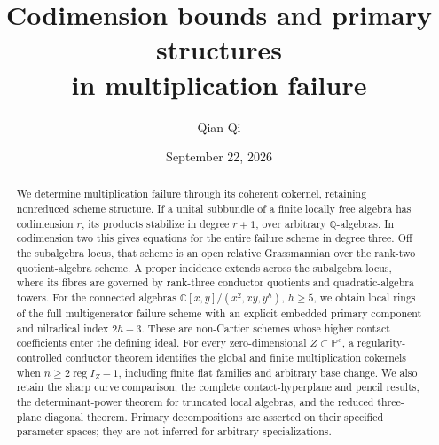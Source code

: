 \documentclass[11pt,reqno]{amsart}
\title[Codimension and multiplication failure]{Codimension bounds and primary structures\\in multiplication failure}
\author{Qian Qi}
\date{September 22, 2026}
\numberwithin{equation}{section}
\theoremstyle{definition}\newtheorem{definition}[theorem]{Definition}
\theoremstyle{remark}\newtheorem{remark}[theorem]{Remark}
\newcommand{\C}{\mathbb C}
\begin{document}
\begin{abstract}
We determine multiplication failure through its coherent cokernel, retaining nonreduced scheme structure. If a unital subbundle of a finite locally free algebra has codimension $r$, its products stabilize in degree $r+1$, over arbitrary $\mathbb Q$-algebras. In codimension two this gives equations for the entire failure scheme in degree three. Off the subalgebra locus, that scheme is an open relative Grassmannian over the rank-two quotient-algebra scheme. A proper incidence extends across the subalgebra locus, where its fibres are governed by rank-three conductor quotients and quadratic-algebra towers. For the connected algebras $\C[x,y]/(x^2,xy,y^h)$, $h\ge5$, we obtain local rings of the full multigenerator failure scheme with an explicit embedded primary component and nilradical index $2h-3$. These are non-Cartier schemes whose higher contact coefficients enter the defining ideal. For every zero-dimensional $Z\subset\mathbb P^e$, a regularity-controlled conductor theorem identifies the global and finite multiplication cokernels when $n\ge2\operatorname{reg}I_Z-1$, including finite flat families and arbitrary base change. We also retain the sharp curve comparison, the complete contact-hyperplane and pencil results, the determinant-power theorem for truncated local algebras, and the reduced three-plane diagonal theorem. Primary decompositions are asserted on their specified parameter spaces; they are not inferred for arbitrary specializations.
\end{abstract}
\maketitle

















\end{document}
